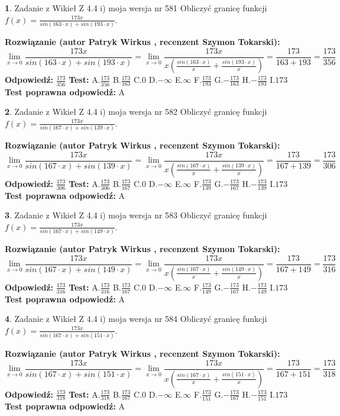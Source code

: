 \documentclass[12pt, a4paper]{article}
\theoremstyle{definition} %
\newtheorem{zad}{}
\newcommand{\zadStart}[1]{\begin{zad}#1\newline}
\newcommand{\zadStop}{\end{zad}}
\newcommand{\rozwStart}[2]{\noindent \textbf{Rozwiązanie (autor #1 , recenzent #2): }\newline}
\newcommand{\rozwStop}{\newline}
\newcommand{\odpStart}{\noindent \textbf{Odpowiedź:}\newline}
\newcommand{\odpStop}{\newline}
\newcommand{\testStart}{\noindent \textbf{Test:}\newline}
\newcommand{\testStop}{\newline}
\newcommand{\kluczStart}{\noindent \textbf{Test poprawna odpowiedź:}\newline}
\newcommand{\kluczStop}{\newline}
\begin{document}
\zadStart{Zadanie z Wikieł Z 4.4 i) moja wersja nr 581}
Obliczyć granicę funkcji $f(x)=\frac{173x}{sin(163\cdot x) +sin(193\cdot x)}$.
\zadStop
\rozwStart{Patryk Wirkus}{Szymon Tokarski}
$$\lim\limits_{x\to 0}\frac{173x}{sin(163\cdot x) +sin(193\cdot x)}=\lim\limits_{x\to 0}\frac{173x}{x(\frac{sin(163\cdot x)}{x}+\frac{sin(193\cdot x)}{x})}=\frac{173}{163+193} = \frac{173}{356}$$
\rozwStop
\odpStart
$\frac{173}{356}$
\odpStop
\testStart
A.$\frac{173}{356}$
B.$\frac{173}{163}$
C.$0$
D.$-\infty$
E.$\infty$
F.$\frac{173}{193}$
G.$-\frac{173}{163}$
H.$-\frac{173}{193}$
I.$173$
\testStop
\kluczStart
A
\kluczStop



\zadStart{Zadanie z Wikieł Z 4.4 i) moja wersja nr 582}
Obliczyć granicę funkcji $f(x)=\frac{173x}{sin(167\cdot x) +sin(139\cdot x)}$.
\zadStop
\rozwStart{Patryk Wirkus}{Szymon Tokarski}
$$\lim\limits_{x\to 0}\frac{173x}{sin(167\cdot x) +sin(139\cdot x)}=\lim\limits_{x\to 0}\frac{173x}{x(\frac{sin(167\cdot x)}{x}+\frac{sin(139\cdot x)}{x})}=\frac{173}{167+139} = \frac{173}{306}$$
\rozwStop
\odpStart
$\frac{173}{306}$
\odpStop
\testStart
A.$\frac{173}{306}$
B.$\frac{173}{167}$
C.$0$
D.$-\infty$
E.$\infty$
F.$\frac{173}{139}$
G.$-\frac{173}{167}$
H.$-\frac{173}{139}$
I.$173$
\testStop
\kluczStart
A
\kluczStop



\zadStart{Zadanie z Wikieł Z 4.4 i) moja wersja nr 583}
Obliczyć granicę funkcji $f(x)=\frac{173x}{sin(167\cdot x) +sin(149\cdot x)}$.
\zadStop
\rozwStart{Patryk Wirkus}{Szymon Tokarski}
$$\lim\limits_{x\to 0}\frac{173x}{sin(167\cdot x) +sin(149\cdot x)}=\lim\limits_{x\to 0}\frac{173x}{x(\frac{sin(167\cdot x)}{x}+\frac{sin(149\cdot x)}{x})}=\frac{173}{167+149} = \frac{173}{316}$$
\rozwStop
\odpStart
$\frac{173}{316}$
\odpStop
\testStart
A.$\frac{173}{316}$
B.$\frac{173}{167}$
C.$0$
D.$-\infty$
E.$\infty$
F.$\frac{173}{149}$
G.$-\frac{173}{167}$
H.$-\frac{173}{149}$
I.$173$
\testStop
\kluczStart
A
\kluczStop



\zadStart{Zadanie z Wikieł Z 4.4 i) moja wersja nr 584}
Obliczyć granicę funkcji $f(x)=\frac{173x}{sin(167\cdot x) +sin(151\cdot x)}$.
\zadStop
\rozwStart{Patryk Wirkus}{Szymon Tokarski}
$$\lim\limits_{x\to 0}\frac{173x}{sin(167\cdot x) +sin(151\cdot x)}=\lim\limits_{x\to 0}\frac{173x}{x(\frac{sin(167\cdot x)}{x}+\frac{sin(151\cdot x)}{x})}=\frac{173}{167+151} = \frac{173}{318}$$
\rozwStop
\odpStart
$\frac{173}{318}$
\odpStop
\testStart
A.$\frac{173}{318}$
B.$\frac{173}{167}$
C.$0$
D.$-\infty$
E.$\infty$
F.$\frac{173}{151}$
G.$-\frac{173}{167}$
H.$-\frac{173}{151}$
I.$173$
\testStop
\kluczStart
A
\kluczStop
\end{document}
